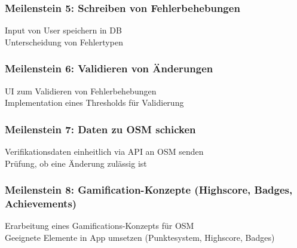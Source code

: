 \subsubsection{Meilenstein 5: Schreiben von Fehlerbehebungen}

\tick Input von User speichern in DB \\
\tick Unterscheidung von Fehlertypen

\subsubsection{Meilenstein 6: Validieren von Änderungen}

\tick UI zum Validieren von Fehlerbehebungen \\
\tick Implementation eines Thresholds für Validierung

\subsubsection{Meilenstein 7: Daten zu OSM schicken}

\cross Verifikationsdaten einheitlich via API an OSM senden \\
\cross Prüfung, ob eine Änderung zulässig ist

\subsubsection{Meilenstein 8: Gamification-Konzepte (Highscore, Badges, Achievements)}

\tick Erarbeitung eines Gamifications-Konzepts für OSM \\
\tick Geeignete Elemente in App umsetzen (Punktesystem, Highscore, Badges)